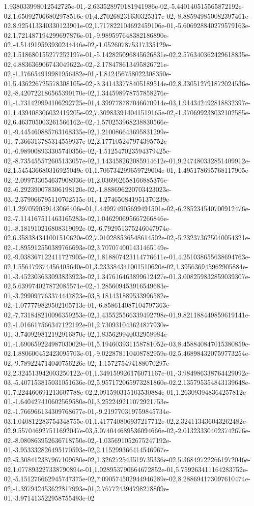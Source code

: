 1.938033998012542725e-01,-2.633528970181941986e-02,-5.440140515565872192e-02,1.650927066802978516e-01,4.270268231630325317e-02,-8.885949850082397461e-02,8.925413340330123901e-02,1.717822104692459106e-01,-5.606928840279579163e-02,1.721487194299697876e-01,-9.989597648382186890e-02,-4.514919593930244446e-02,-1.052607875317335129e-02,1.518680155277252197e-01,-5.142825096845626831e-02,2.576340362429618835e-02,4.883636906743049622e-02,-2.178478613495826721e-02,-1.176654919981956482e-01,-1.842456758022308350e-01,5.436226725578308105e-02,-3.341433778405189514e-02,8.330512791872024536e-02,-8.420722186565399170e-02,1.344598978757858276e-01,-1.731429994106292725e-01,4.399778787046670914e-03,1.914342492818832397e-01,1.439408306032419205e-02,7.309833914041519165e-02,-1.370699238032102585e-02,6.463705003261566162e-02,-1.570253968238830566e-01,-9.445460885763168335e-02,1.210086643695831299e-01,-7.366313785314559937e-02,2.177105247974395752e-01,-6.989008933305740356e-02,-1.512547023594379425e-02,-8.735455572605133057e-02,1.143458262085914612e-01,9.247480332851409912e-02,1.545436680316925049e-01,1.706734299659729004e-01,-1.495178695768117905e-02,-2.099733054637908936e-01,2.036962658166885376e-02,-6.292390078306198120e-02,-1.888696220703423023e-03,-2.379066795110702515e-01,-1.274650841951370239e-01,1.297059059143066406e-01,1.449974905699491501e-02,-6.285234540700912476e-02,-7.114167511463165283e-02,1.046290695667266846e-01,-8.181910216808319092e-02,-6.792951375246047974e-02,6.358384341001510620e-02,7.010288536548614502e-02,-5.232373625040054321e-02,-1.895912550389766693e-02,3.707074001431465149e-02,-9.038367122411727905e-02,1.818807423114776611e-01,4.251038655638694763e-02,1.556179374456405640e-01,3.233384341001510620e-02,1.395636945962905884e-01,-3.452303633093833923e-02,1.347616463899612427e-01,3.008259832859039307e-02,5.639974027872085571e-02,-1.285609453916549683e-01,-3.299097763374447823e-03,8.181431889533996582e-02,-1.077779829502105713e-01,-6.858614087104797363e-02,-7.731848210096359253e-02,1.435525566339492798e-01,9.821188449859619141e-02,-1.016617566347122192e-01,2.730931043624877930e-01,-3.740929812192916870e-02,1.835629940032958984e-01,-1.690659224987030029e-01,5.194603931158781052e-03,8.458840847015380859e-02,1.880600452423095703e-01,-9.022878110408782959e-02,5.468984320759773254e-02,-9.789224714040756226e-02,-1.157275494188070297e-02,2.324513942003250122e-01,1.349159926176071167e-01,-3.984986338764429092e-03,-5.407153815031051636e-02,5.957172065973281860e-02,2.135795354843139648e-01,7.224460691213607788e-02,2.091590315103530884e-01,1.263093948364257812e-01,-1.640427410602569580e-01,3.252249211072921753e-02,-1.766966134309768677e-01,-9.219770319759845734e-03,1.040812283754348755e-01,1.417740806937217712e-02,2.324113436043262482e-02,9.557046927511692047e-03,5.074044689536094666e-02,-2.013233304023742676e-02,-8.080863952636718750e-02,-1.035691052675247192e-01,-3.953332826495170593e-02,2.115299366414546967e-02,-5.308412387967109680e-02,1.326272543519735336e-02,5.368497222661972046e-02,1.077893227338790894e-01,1.028953790664672852e-01,5.759263411164283752e-02,-5.151276662945747375e-02,7.090574502944946289e-02,8.288694173097610474e-02,-1.397942453622817993e-01,2.767724394798278809e-01,-3.971413522958755493e-02
